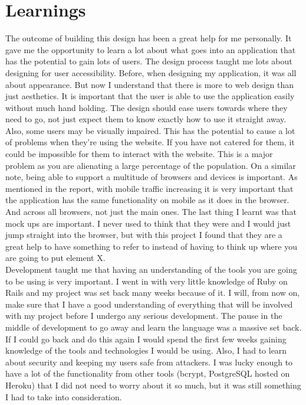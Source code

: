 \section{Learnings}
The outcome of building this design has been a great help for me personally. It gave me the opportunity to learn a lot about what goes into an application that has the potential to gain lots of users. The design process taught me lots about designing for user accessibility. Before, when designing my application, it was all about appearance. But now I understand that there is more to web design than just aesthetics. It is important that the user is able to use the application easily without much hand holding. The design should ease users towards where they need to go, not just expect them to know exactly how to use it straight away. Also, some users may be visually impaired. This has the potential to cause a lot of problems when they're using the website. If you have not catered for them, it could be impossible for them to interact with the website. This is a major problem as you are alienating a large percentage of the population. On a similar note, being able to support a multitude of browsers and devices is important. As mentioned in the report, with mobile traffic increasing it is very important that the application has the same functionality on mobile as it does in the browser. And across all browsers, not just the main ones. The last thing I learnt was that mock ups are important. I never used to think that they were and I would just jump straight into the browser, but with this project I found that they are a great help to have something to refer to instead of having to think up where you are going to put element X.\\

Development taught me that having an understanding of the tools you are going to be using is very important. I went in with very little knowledge of Ruby on Rails and my project was set back many weeks because of it. I will, from now on, make sure that I have a good understanding of everything that will be involved with my project before I undergo any serious development. The pause in the middle of development to go away and learn the language was a massive set back. If I could go back and do this again I would spend the first few weeks gaining knowledge of the tools and technologies I would be using. Also, I had to learn about security and keeping my users safe from attackers. I was lucky enough to have a lot of the functionality from other tools (bcrypt, PostgreSQL hosted on Heroku) that I did not need to worry about it so much, but it was still something I had to take into consideration.\\

